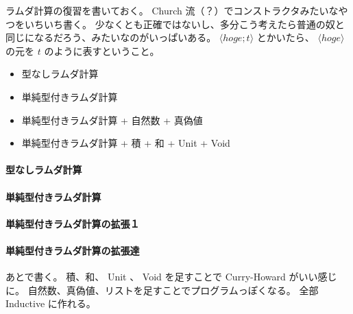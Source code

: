 ラムダ計算の復習を書いておく。
Church 流（？）でコンストラクタみたいなやつをいちいち書く。
少なくとも正確ではないし、多分こう考えたら普通の奴と同じになるだろう、みたいなのがいっぱいある。
\(\langle hoge ; t \rangle\) とかいたら、 \(\langle hoge \rangle\) の元を \(t\) のように表すということ。

\begin{itemize}
  \item 型なしラムダ計算
  \item 単純型付きラムダ計算
  \item 単純型付きラムダ計算 + 自然数 + 真偽値
  \item 単純型付きラムダ計算 + 積 + 和 + Unit + Void
\end{itemize}

\newpage

\paragraph*{型なしラムダ計算}

\newpage

\paragraph*{単純型付きラムダ計算}

\newpage

\paragraph*{単純型付きラムダ計算の拡張１}


\paragraph*{単純型付きラムダ計算の拡張達}
あとで書く。
積、和、 Unit 、 Void を足すことで Curry-Howard がいい感じに。
自然数、真偽値、リストを足すことでプログラムっぽくなる。
全部 Inductive に作れる。
